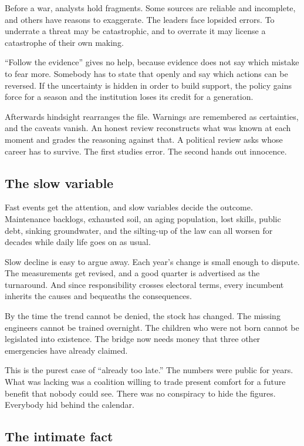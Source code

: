 \documentclass[12pt,a4paper]{book}
\begin{document}
Before a war, analysts hold fragments. Some sources are reliable and incomplete, and others have reasons to exaggerate. The leaders face lopsided errors. To underrate a threat may be catastrophic, and to overrate it may license a catastrophe of their own making.

``Follow the evidence'' gives no help, because evidence does not say which mistake to fear more. Somebody has to state that openly and say which actions can be reversed. If the uncertainty is hidden in order to build support, the policy gains force for a season and the institution loses its credit for a generation.

Afterwards hindsight rearranges the file. Warnings are remembered as certainties, and the caveats vanish. An honest review reconstructs what was known at each moment and grades the reasoning against that. A political review asks whose career has to survive. The first studies error. The second hands out innocence.

\subsection{The slow variable}

Fast events get the attention, and slow variables decide the outcome. Maintenance backlogs, exhausted soil, an aging population, lost skills, public debt, sinking groundwater, and the silting-up of the law can all worsen for decades while daily life goes on as usual.

Slow decline is easy to argue away. Each year's change is small enough to dispute. The measurements get revised, and a good quarter is advertised as the turnaround. And since responsibility crosses electoral terms, every incumbent inherits the causes and bequeaths the consequences.

By the time the trend cannot be denied, the stock has changed. The missing engineers cannot be trained overnight. The children who were not born cannot be legislated into existence. The bridge now needs money that three other emergencies have already claimed.

This is the purest case of ``already too late.'' The numbers were public for years. What was lacking was a coalition willing to trade present comfort for a future benefit that nobody could see. There was no conspiracy to hide the figures. Everybody hid behind the calendar.

\subsection{The intimate fact}
\end{document}
